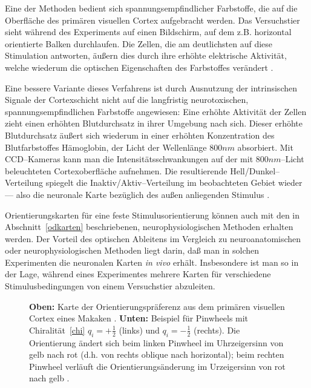 Eine der Methoden bedient sich spannungsempfindlicher Farbstoffe, die auf
die Oberfläche des primären visuellen Cortex aufgebracht werden. Das
Versuchstier sieht während des Experiments auf einen Bildschirm, auf dem
z.B. horizontal orientierte Balken durchlaufen. Die Zellen, die am
deutlichsten auf diese Stimulation antworten, äußern dies durch ihre
erhöhte elektrische Aktivität, welche wiederum die optischen
Eigenschaften des Farbstoffes verändert \cite{blasdel:1986,blasdel:1992a}.

Eine bessere Variante dieses Verfahrens ist durch Ausnutzung der
intrinsischen Signale der Cortexschicht nicht auf die langfristig
neurotoxischen, spannungsempfindlichen Farbstoffe angewiesen: Eine erhöhte
Aktivität der Zellen zieht einen erhöhten Blutdurchsatz in ihrer Umgebung
nach sich. Dieser erhöhte Blutdurchsatz äußert sich wiederum in einer
erhöhten Konzentration des Blutfarbstoffes Hämoglobin, der Licht der
Wellenlänge $800nm$ absorbiert. Mit CCD--Kameras kann man die
Intensitätsschwankungen auf der mit $800nm$--Licht beleuchteten
Cortexoberfläche aufnehmen. Die resultierende Hell/Dunkel--Verteilung
spiegelt die Inaktiv/Aktiv--Verteilung im beobachteten Gebiet wieder ---
also die neuronale Karte bezüglich des außen anliegenden Stimulus
\cite{lieke:1989,grinvald:1991}.

Orientierungskarten für eine feste Stimulusorientierung können auch mit
den in Abschnitt~\ref{odkarten} beschriebenen, neurophysiologischen
Methoden erhalten werden.  Der Vorteil des optischen Ableitens im Vergleich
zu neuroanatomischen oder neurophysiologischen Methoden liegt darin, daß
man in solchen Experimenten die neuronalen Karten \emph{in vivo}
erhält. Insbesondere ist man so in der Lage, während eines Experimentes
mehrere Karten für verschiedene Stimulusbedingungen von einem Versuchstier
abzuleiten.

\begin{figure}[t]
\begin{center}
\begin{minipage}{10cm}
\end{minipage}
\vskip0.5cm
\begin{minipage}[b]{4cm}
\end{minipage}
\end{center}
\caption{\textbf{Oben:} Karte der Orientierungspräferenz aus dem primären
visuellen Cortex eines Makaken \protect{}.
\textbf{Unten:} Beispiel für Pinwheels mit Chiralität~\eqref{chi}
$q_i=+\frac{1}{2}$ (links) und $q_i=-\frac{1}{2}$ (rechts). Die
Orientierung ändert sich beim linken Pinwheel im Uhrzeigersinn von gelb
nach rot (d.h. von rechts oblique nach horizontal); beim rechten Pinwheel
verläuft die Orientierungsänderung im Urzeigersinn von rot nach gelb
\protect{}.}
\label{opblasdel}
\end{figure}

